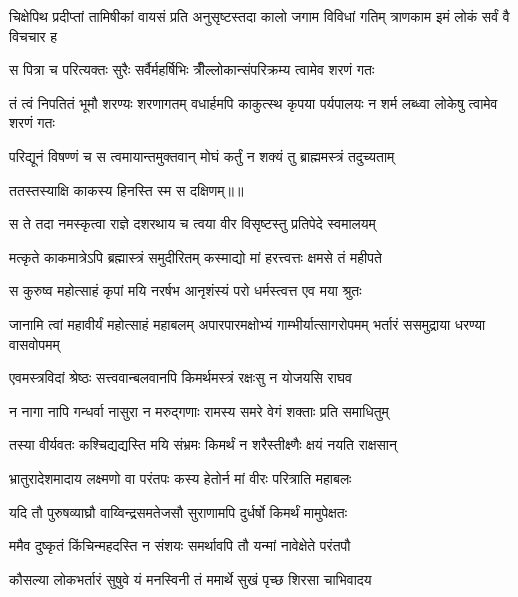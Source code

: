 \threelineshloka
{चिक्षेपिथ प्रदीप्तां तामिषीकां वायसं प्रति}
{अनुसृष्टस्तदा कालो जगाम विविधां गतिम्}
{त्राणकाम इमं लोकं सर्वं वै विचचार ह} %

\twolineshloka
{स पित्रा च परित्यक्तः सुरैः सर्वैर्महर्षिभिः}
{त्रीँल्लोकान्संपरिक्रम्य त्वामेव शरणं गतः} %

\threelineshloka
{तं त्वं निपतितं भूमौ शरण्यः शरणागतम्}
{वधार्हमपि काकुत्स्थ कृपया पर्यपालयः}
{न शर्म लब्ध्वा लोकेषु त्वामेव शरणं गतः} %

\twolineshloka
{परिद्यूनं विषण्णं च स त्वमायान्तमुक्तवान्}
{मोघं कर्तुं न शक्यं तु ब्राह्ममस्त्रं तदुच्यताम्} %

{ततस्तस्याक्षि काकस्य हिनस्ति स्म स दक्षिणम्॥॥} %

\addtocounter{shlokacount}{1}

\twolineshloka
{स ते तदा नमस्कृत्वा राज्ञे दशरथाय च}
{त्वया वीर विसृष्टस्तु प्रतिपेदे स्वमालयम्} %

\twolineshloka
{मत्कृते काकमात्रेऽपि ब्रह्मास्त्रं समुदीरितम्}
{कस्माद्यो मां हरत्त्वत्तः क्षमसे तं महीपते} %

\twolineshloka
{स कुरुष्व महोत्साहं कृपां मयि नरर्षभ}
{आनृशंस्यं परो धर्मस्त्वत्त एव मया श्रुतः} %

\threelineshloka
{जानामि त्वां महावीर्यं महोत्साहं महाबलम्}
{अपारपारमक्षोभ्यं गाम्भीर्यात्सागरोपमम्}
{भर्तारं ससमुद्राया धरण्या वासवोपमम्} %

\twolineshloka
{एवमस्त्रविदां श्रेष्ठः सत्त्ववान्बलवानपि}
{किमर्थमस्त्रं रक्षःसु न योजयसि राघव} %

\twolineshloka
{न नागा नापि गन्धर्वा नासुरा न मरुद्गणाः}
{रामस्य समरे वेगं शक्ताः प्रति समाधितुम्} %

\twolineshloka
{तस्या वीर्यवतः कश्चिद्यद्यस्ति मयि संभ्रमः}
{किमर्थं न शरैस्तीक्ष्णैः क्षयं नयति राक्षसान्} %

\twolineshloka
{भ्रातुरादेशमादाय लक्ष्मणो वा परंतपः}
{कस्य हेतोर्न मां वीरः परित्राति महाबलः} %

\twolineshloka
{यदि तौ पुरुषव्याघ्रौ वाय्विन्द्रसमतेजसौ}
{सुराणामपि दुर्धर्षो किमर्थं मामुपेक्षतः} %

\twolineshloka
{ममैव दुष्कृतं किंचिन्महदस्ति न संशयः}
{समर्थावपि तौ यन्मां नावेक्षेते परंतपौ} %

\twolineshloka
{कौसल्या लोकभर्तारं सुषुवे यं मनस्विनी}
{तं ममार्थे सुखं पृच्छ शिरसा चाभिवादय} %

